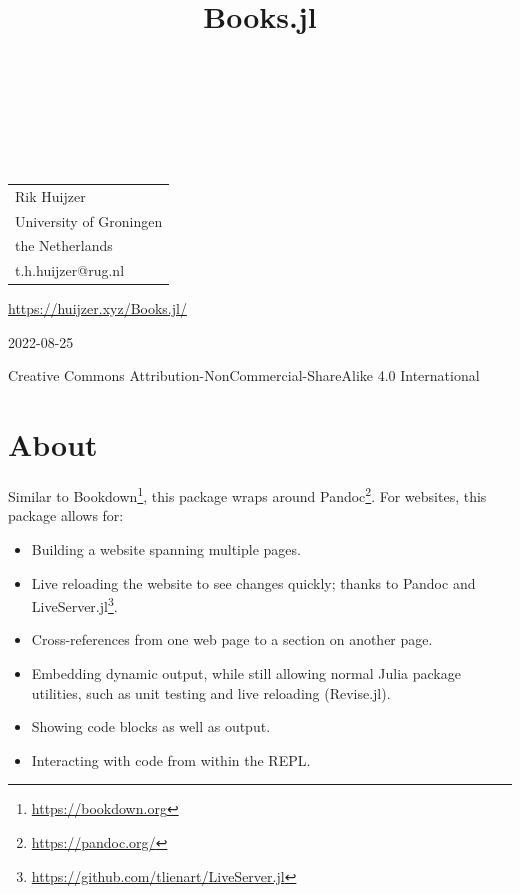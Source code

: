 \documentclass[
  notoc %
]{tufte-book}
\title{Books.jl}
\author{\noindent{Rik Huijzer}\\[3mm] \noindent{and
contributors}\\[3mm] }
\date{}
\DeclareRobustCommand{\href}[2]{#2\footnote{\url{#1}}}
\providecommand{\tightlist}{%
  \setlength{\itemsep}{0pt}\setlength{\parskip}{0pt}
}
\begin{document}
\makeatletter
\thispagestyle{empty}
\vfill
{\Huge\bf
\noindent
\@title
}\\[1in]
{\Large
\noindent
\@author
}
\makeatother

\makeatletter
\newpage
\thispagestyle{empty}
\vfill
{\noindent
\begin{tabular}{l} Rik Huijzer\\ University of Groningen\\ the Netherlands\\ t.h.huijzer@rug.nl\\ \end{tabular}
}
\vfill
{\small
\url{https://huijzer.xyz/Books.jl/}

2022-08-25

Creative Commons Attribution-NonCommercial-ShareAlike 4.0 International
}
\makeatother


\frontmatter
\mainmatter

\setcounter{tocdepth}{1}
\tableofcontents

\justifying

\setlength{\parindent}{0pt}

\hypertarget{sec:about}{%
\chapter{About}\label{sec:about}}

Similar to \href{https://bookdown.org}{Bookdown}, this package wraps
around \href{https://pandoc.org/}{Pandoc}. For websites, this package
allows for:

\begin{itemize}
\tightlist
\item
  Building a website spanning multiple pages.
\item
  Live reloading the website to see changes quickly; thanks to Pandoc
  and \href{https://github.com/tlienart/LiveServer.jl}{LiveServer.jl}.
\item
  Cross-references from one web page to a section on another page.
\item
  Embedding dynamic output, while still allowing normal Julia package
  utilities, such as unit testing and live reloading (Revise.jl).
\item
  Showing code blocks as well as output.
\item
  Interacting with code from within the REPL.
\end{itemize}
\end{document}
